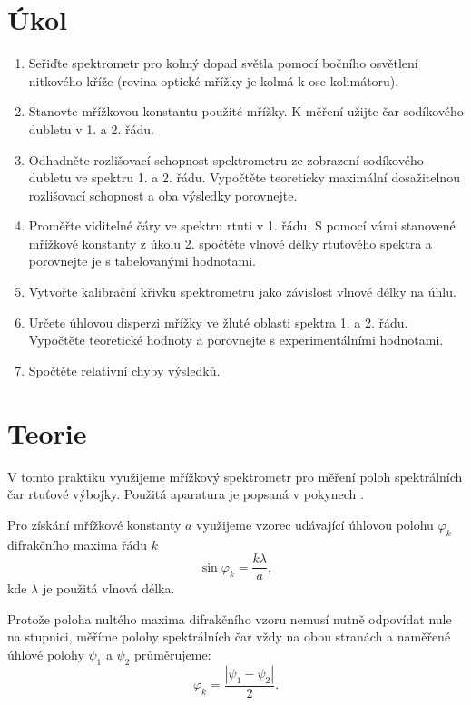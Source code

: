 \documentclass{protokol}
\begin{document}
  \section*{Úkol}

    \begin{enumerate}
      \item Seřiďte spektrometr pro kolmý dopad světla pomocí bočního osvětlení nitkového kříže (rovina optické mřížky je kolmá k ose kolimátoru).
      \item Stanovte mřížkovou konstantu použité mřížky. K měření užijte čar sodíkového dubletu v 1. a 2. řádu.
      \item Odhadněte rozlišovací schopnost spektrometru ze zobrazení sodíkového dubletu ve spektru 1. a 2. řádu. Vypočtěte teoreticky maximální dosažitelnou rozlišovací schopnost a oba výsledky porovnejte.
      \item Proměřte viditelné čáry ve spektru rtuti v 1. řádu. S pomocí vámi stanovené mřížkové konstanty z úkolu 2. spočtěte vlnové délky rtuťového spektra a porovnejte je s tabelovanými hodnotami.
      \item Vytvořte kalibrační křivku spektrometru jako závislost vlnové délky na úhlu.
      \item Určete úhlovou disperzi mřížky ve žluté oblasti spektra 1. a 2. řádu. Vypočtěte teoretické hodnoty a porovnejte s experimentálními hodnotami.
      \item Spočtěte relativní chyby výsledků.
    \end{enumerate}

  \section*{Teorie}

    V tomto praktiku využijeme mřížkový spektrometr pro měření poloh spektrálních čar rtuťové výbojky. Použitá aparatura je popsaná v pokynech \cite{pokyny}.

    Pro získání mřížkové konstanty $a$ využijeme vzorec udávající úhlovou polohu $\varphi_k$ difrakčního maxima řádu $k$
    \begin{equation} \label{eq:a}
      \sin \varphi_k = \frac{k \lambda}{a},
    \end{equation}
    kde $\lambda$ je použitá vlnová délka.

    Protože poloha nultého maxima difrakčního vzoru nemusí nutně odpovídat nule na stupnici, měříme polohy spektrálních čar vždy na obou stranách a naměřené úhlové polohy $\psi_1$ a $\psi_2$ průměrujeme:
    \begin{equation}
      \varphi_k = \frac{|\psi_1 - \psi_2|}{2}.
    \end{equation}
\end{document}
